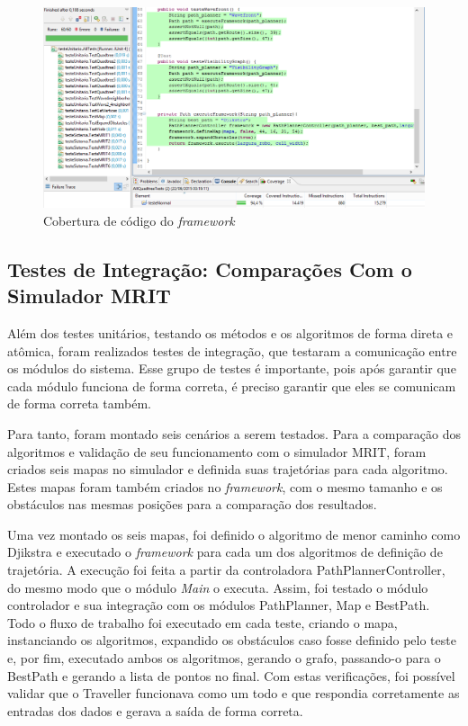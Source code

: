 \begin{figure}[h]
	\centering
	\label{fig38}
		\includegraphics[keepaspectratio=true,scale=0.6]{figuras/cobertura.PNG}
	\caption{Cobertura de código do \textit{framework}}
\end{figure}

\subsection{Testes de Integração: Comparações Com o Simulador MRIT}

Além dos testes unitários, testando os métodos e os algoritmos de forma direta e atômica, foram realizados testes de integração, que testaram a comunicação entre os módulos do sistema. Esse grupo de testes é importante, pois após garantir que cada módulo funciona de forma correta, é preciso garantir que eles se comunicam de forma correta também.

Para tanto, foram montado seis cenários a serem testados. Para a comparação dos algoritmos e validação de seu funcionamento com o simulador MRIT, foram criados seis mapas no simulador e definida suas trajetórias para cada algoritmo. Estes mapas foram também criados no \textit{framework}, com o mesmo tamanho e os obstáculos nas mesmas posições para a comparação dos resultados.

Uma vez montado os seis mapas, foi definido o algoritmo de menor caminho como Djikstra e executado o \textit{framework} para cada um dos algoritmos de definição de trajetória. A execução foi feita a partir da controladora PathPlannerController, do mesmo modo que o módulo \textit{Main} o executa. Assim, foi testado o módulo controlador e sua integração com os módulos PathPlanner, Map e BestPath. Todo o fluxo de trabalho foi executado em cada teste, criando o mapa, instanciando os algoritmos, expandido os obstáculos caso fosse definido pelo teste e, por fim, executado ambos os algoritmos, gerando o grafo, passando-o para o BestPath e gerando a lista de pontos no final. Com estas verificações, foi possível validar que o Traveller funcionava como um todo e que respondia corretamente as entradas dos dados e gerava a saída de forma correta.


